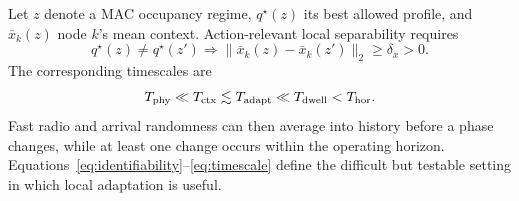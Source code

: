 Let $z$ denote a MAC occupancy regime, $q^\star(z)$ its best allowed profile,
and $\bar x_k(z)$ node $k$'s mean context. Action-relevant local separability
requires
\begin{equation}
q^\star(z)\ne q^\star(z')\Longrightarrow
\|\bar x_k(z)-\bar x_k(z')\|_2\geq\delta_x>0.
\label{eq:identifiability}
\end{equation}
The corresponding timescales are
\begin{equation}
T_{\rm phy}\ll T_{\rm ctx}\lesssim T_{\rm adapt}
\ll T_{\rm dwell}<T_{\rm hor}.
\label{eq:timescale}
\end{equation}
Fast radio and arrival randomness can then average into history before a phase
changes, while at least one change occurs within the operating horizon.
Equations~\eqref{eq:identifiability}--\eqref{eq:timescale} define the difficult
but testable setting in which local adaptation is useful.
